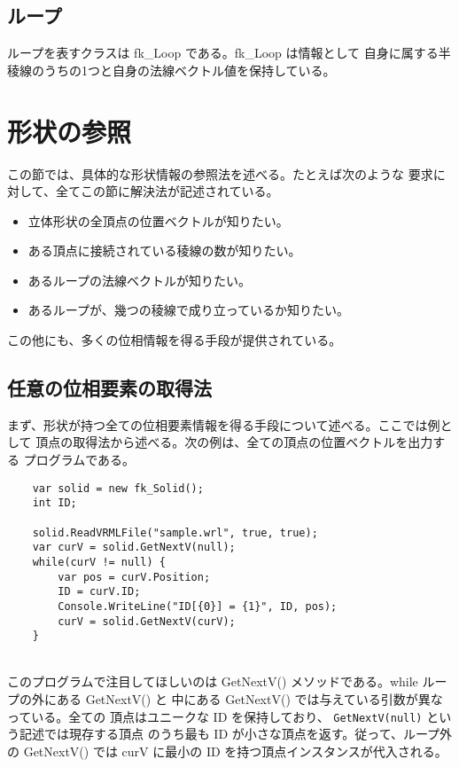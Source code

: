 \subsection{ループ}
ループを表すクラスは fk\_Loop である。fk\_Loop は情報として
自身に属する半稜線のうちの1つと自身の法線ベクトル値を保持している。

\section{形状の参照}
この節では、具体的な形状情報の参照法を述べる。たとえば次のような
要求に対して、全てこの節に解決法が記述されている。
\begin{itemize}
 \item 立体形状の全頂点の位置ベクトルが知りたい。
 \item ある頂点に接続されている稜線の数が知りたい。
 \item あるループの法線ベクトルが知りたい。
 \item あるループが、幾つの稜線で成り立っているか知りたい。
\end{itemize}
この他にも、多くの位相情報を得る手段が提供されている。

\subsection{任意の位相要素の取得法}
まず、形状が持つ全ての位相要素情報を得る手段について述べる。ここでは例として
頂点の取得法から述べる。次の例は、全ての頂点の位置ベクトルを出力する
プログラムである。
\\
\begin{breakbox}
\begin{verbatim}
    var solid = new fk_Solid();
    int ID;

    solid.ReadVRMLFile("sample.wrl", true, true);
    var curV = solid.GetNextV(null);
    while(curV != null) {
        var pos = curV.Position;
        ID = curV.ID;
        Console.WriteLine("ID[{0}] = {1}", ID, pos);
        curV = solid.GetNextV(curV);
    }
\end{verbatim}
\end{breakbox}
~ \\
このプログラムで注目してほしいのは
GetNextV() メソッドである。while ループの外にある GetNextV() と
中にある GetNextV() では与えている引数が異なっている。全ての
頂点はユニークな ID を保持しており、
\verb+GetNextV(null)+ という記述では現存する頂点
のうち最も ID が小さな頂点を返す。従って、ループ外の GetNextV() では
curV に最小の ID を持つ頂点インスタンスが代入される。

